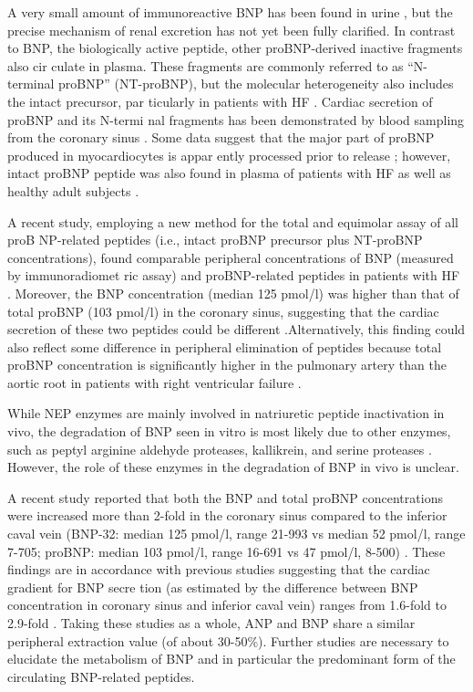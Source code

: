 \documentclass[14pt,a4paper,onecolumn]{extarticle}
\begin{document}
A very small amount of immunoreactive BNP has been found in urine \citep{202}\citep{203}, but the precise mechanism of renal excretion has not yet been fully clarified. In contrast to BNP, the biologically active peptide, other proBNP-derived inactive fragments also cir culate in plasma. These fragments are commonly referred to as “N-terminal proBNP” (NT-proBNP), but the molecular heterogeneity also includes the intact precursor, par ticularly in patients with HF \citep{14}\citep{204}. Cardiac secretion of proBNP and its N-termi nal fragments has been demonstrated by blood sampling from the coronary sinus \citep{205}.  Some data suggest that the major part of proBNP produced in myocardiocytes is appar ently processed prior to release \citep{14}; however, intact proBNP peptide was also found in plasma of patients with HF as well as healthy adult subjects \citep{14}\citep{205}\citep{206}.

A recent study, employing a new method for the total and equimolar assay of all proB NP-related peptides (i.e., intact proBNP precursor plus NT-proBNP concentrations), found comparable peripheral concentrations of BNP (measured by immunoradiomet ric assay) and proBNP-related peptides in patients with HF \citep{206}. Moreover, the BNP concentration (median 125 pmol/l) was higher than that of total proBNP (103 pmol/l) in the coronary sinus, suggesting that the cardiac secretion of these two peptides could be different \citep{206}.Alternatively, this finding could also reflect some difference in peripheral elimination of peptides because total proBNP concentration is significantly higher in the pulmonary artery than the aortic root in patients with right ventricular failure \citep{207}.

While NEP enzymes are mainly involved in natriuretic peptide inactivation in vivo, the degradation of BNP seen in vitro is most likely due to other enzymes, such as peptyl arginine aldehyde proteases, kallikrein, and serine proteases \citep{15}. However, the role of these enzymes in the degradation of BNP in vivo is unclear.

A recent study reported that both the BNP and total proBNP concentrations were increased more than 2-fold in the coronary sinus compared to the inferior caval vein (BNP-32: median 125 pmol/l, range 21-993 vs median 52 pmol/l, range 7-705; proBNP: median 103 pmol/l, range 16-691 vs 47 pmol/l, 8-500) \citep{206}. These findings are in accordance with previous studies suggesting that the cardiac gradient for BNP secre tion (as estimated by the difference between BNP concentration in coronary sinus and inferior caval vein) ranges from 1.6-fold to 2.9-fold \citep{204}\citep{208-210}. Taking these studies as a whole, ANP and BNP share a similar peripheral extraction value (of about 30-50\%). Further studies are necessary to elucidate the metabolism of BNP and in particular the predominant form of the circulating BNP-related peptides.
\end{document}
